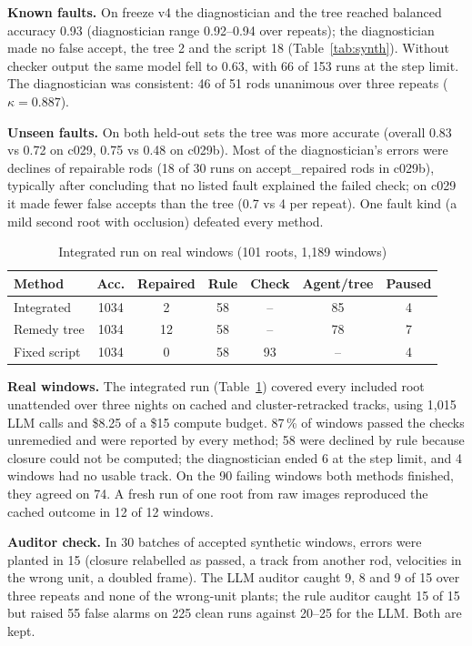 \documentclass[conference]{IEEEtran}
\begin{document}
\textbf{Known faults.} On freeze v4 the diagnostician and the tree reached balanced accuracy 0.93 (diagnostician range 0.92--0.94 over repeats); the diagnostician made no false accept, the tree 2 and the script 18 (Table~\ref{tab:synth}). Without checker output the same model fell to 0.63, with 66 of 153 runs at the step limit. The diagnostician was consistent: 46 of 51 rods unanimous over three repeats ($\kappa=0.887$).

\textbf{Unseen faults.} On both held-out sets the tree was more accurate (overall 0.83 vs 0.72 on c029, 0.75 vs 0.48 on c029b). Most of the diagnostician's errors were declines of repairable rods (18 of 30 runs on accept\_repaired rods in c029b), typically after concluding that no listed fault explained the failed check; on c029 it made fewer false accepts than the tree (0.7 vs 4 per repeat). One fault kind (a mild second root with occlusion) defeated every method.

\begin{table}[t]
\caption{Integrated run on real windows (101 roots, 1,189 windows)}
\label{tab:real}
\centering
\setlength{\tabcolsep}{2.6pt}
\begin{tabular}{lcccccc}
\toprule
Method & Acc. & Repaired & Rule & Check & Agent/tree & Paused \\
\midrule
Integrated & 1034 & 2 & 58 & -- & 85 & 4 \\
Remedy tree & 1034 & 12 & 58 & -- & 78 & 7 \\
Fixed script & 1034 & 0 & 58 & 93 & -- & 4 \\
\bottomrule
\end{tabular}
\end{table}

\textbf{Real windows.} The integrated run (Table~\ref{tab:real}) covered every included root unattended over three nights on cached and cluster-retracked tracks, using 1,015 LLM calls and \$8.25 of a \$15 compute budget. 87\,\% of windows passed the checks unremedied and were reported by every method; 58 were declined by rule because closure could not be computed; the diagnostician ended 6 at the step limit, and 4 windows had no usable track. On the 90 failing windows both methods finished, they agreed on 74. A fresh run of one root from raw images reproduced the cached outcome in 12 of 12 windows.

\textbf{Auditor check.} In 30 batches of accepted synthetic windows, errors were planted in 15 (closure relabelled as passed, a track from another rod, velocities in the wrong unit, a doubled frame). The LLM auditor caught 9, 8 and 9 of 15 over three repeats and none of the wrong-unit plants; the rule auditor caught 15 of 15 but raised 55 false alarms on 225 clean runs against 20--25 for the LLM. Both are kept.
\end{document}

